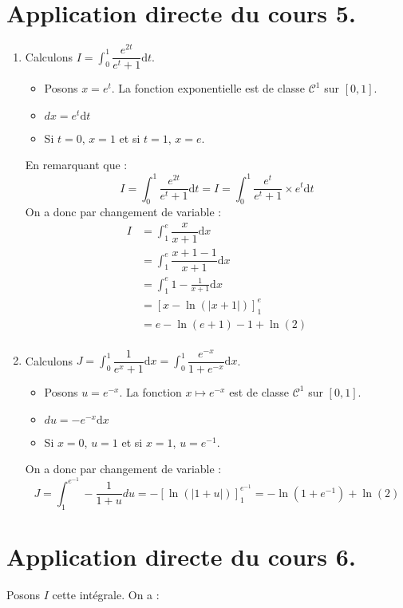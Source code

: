 \documentclass[french,11pt,twoside]{VcCours}
\newcommand{\dx}{\text{d}x}
\newcommand{\dt}{\text{d}t}
\begin{document}
\section*{Application directe du cours 5.}
\begin{enumerate}
\item Calculons $I= \int_{0}^1 \dfrac{e^{2t}}{e^t+1} \dt$.
\begin{itemize}
\item Posons $x = e^t$. La fonction exponentielle est de classe $\mathcal{C}^1$ sur $[0,1]$.
\item $dx =e^t \dt$
\item Si $t=0$, $x=1$ et si $t=1$, $x =e$.
\end{itemize}
En remarquant que :
$$ I= \int_{0}^1 \dfrac{e^{2t}}{e^t+1} \dt = I= \int_{0}^1 \dfrac{e^{t}}{e^t+1} \times e^t \dt $$
On a donc par changement de variable :
\begin{align*}
I & = \int_{1}^{e}  \dfrac{x}{x+1} \dx \\
& = \int_{1}^{e}  \dfrac{x+1-1}{x+1} \dx \\
& = \int_{1}^e 1 - \frac{1}{x+1} \dx\\
& = [x- \ln(\vert x+1 \vert)]_{1}^{e} \\
& = e- \ln(e+1)-1+ \ln(2) \\
\end{align*}
\item  Calculons $J = \int_{0}^1 \dfrac{1}{e^x+1} \dx = \int_{0}^1 \dfrac{e^{-x}}{1+e^{-x}} \dx$.
\begin{itemize}
\item Posons $u=e^{-x}$. La fonction $x \mapsto e^{-x}$ est de classe $\mathcal{C}^1$ sur $[0,1]$.
\item $du = -e^{-x} \dx$
\item Si $x=0$, $u=1$ et si $x=1$, $u=e^{-1}$.
\end{itemize}
On a donc par changement de variable :
$$ J = \int_{1}^{e^{-1}} - \frac{1}{1+u} du = - [\ln(\vert 1+u \vert)]_{1}^{e^{-1}} = - \ln(1+e^{-1})+ \ln(2) $$
\end{enumerate}

\medskip

\section*{Application directe du cours 6.}

Posons $I$ cette intégrale. On a :
\end{document}
